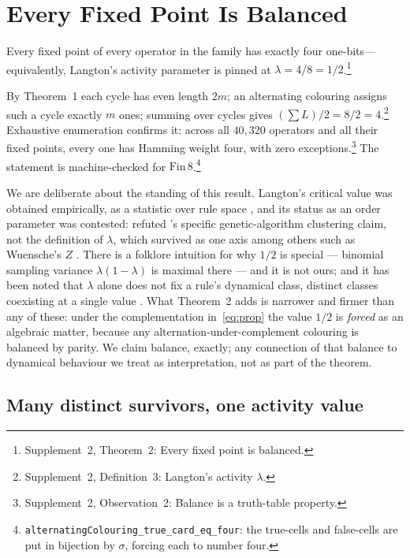 \documentclass[man,12pt,floatsintext,donotrepeattitle]{apa7}
\newcommand{\sig}{\sigma}
\newcommand{\supptheorytext}[2]{Supplement~2, #1: #2.}
\newcommand{\supptheory}[2]{\footnote{\supptheorytext{#1}{#2}}}
\begin{document}
\section{Every Fixed Point Is Balanced}
\label{sec:lambda}

Every fixed point of every operator in the family has exactly four one-bits---equivalently,
Langton's activity parameter is pinned at $\lambda = 4/8 = 1/2$.\supptheory{Theorem~2}{Every fixed point is balanced}

\noindent By Theorem~1 each cycle has even length $2m$; an
alternating colouring assigns such a cycle exactly $m$ ones; summing over
cycles gives $(\sum L)/2 = 8/2 = 4$.\supptheory{Definition~3}{Langton's activity $\lambda$} Exhaustive enumeration confirms it:
across all $40{,}320$ operators and all their fixed points, every one has
Hamming weight four, with zero exceptions.\supptheory{Observation~2}{Balance is a truth-table property} The statement is machine-checked
for $\mathrm{Fin}\,8$.\footnote{%
\texttt{alternatingColouring\_true\_card\_eq\_four}: the true-cells and
false-cells are put in bijection by $\sig$, forcing each to number four.}

We are deliberate about the standing of this result. Langton's critical
value was obtained empirically, as a statistic over rule space
\parencite{langton1990computation}, and its status as an order parameter
was contested: \textcite{mitchell1993revisiting} refuted
\textcite{packard1988adaptation}'s specific genetic-algorithm clustering
claim, not the definition of $\lambda$, which survived as one axis among
others such as Wuensche's $Z$ \parencite{wuensche1999classifying}. There is
a folklore intuition for why $1/2$ is special --- binomial sampling variance
$\lambda(1-\lambda)$ is maximal there --- and it is not ours; and it has been
noted that $\lambda$ alone does not fix a rule's dynamical class, distinct
classes coexisting at a single value \parencite{sakai2002edge}. What
Theorem~2 adds is narrower and firmer than any of these: under
the complementation in~\eqref{eq:prop} the value $1/2$ is \emph{forced} as an
algebraic matter, because any alternation-under-complement colouring is
balanced by parity. We claim balance, exactly; any connection of that
balance to dynamical behaviour we treat as interpretation, not as part of the
theorem.

\subsection{Many distinct survivors, one activity value}
\end{document}

